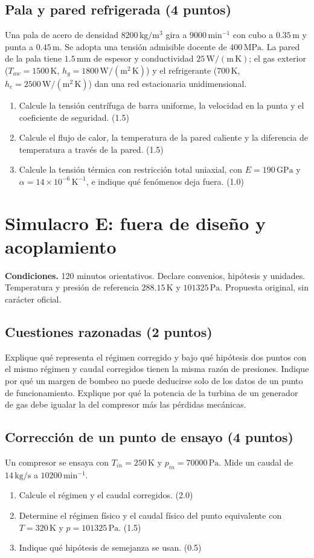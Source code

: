 \section{Pala y pared refrigerada (4 puntos)}
Una pala de acero de densidad $8200\,\mathrm{kg/m^3}$ gira a $9000\,\mathrm{min^{-1}}$ con cubo a $0.35\,\mathrm m$ y punta a $0.45\,\mathrm m$. Se adopta una tensión admisible docente de $400\,\mathrm{MPa}$. La pared de la pala tiene $1.5\,\mathrm{mm}$ de espesor y conductividad $25\,\mathrm{W/(m\,K)}$; el gas exterior ($T_{aw}=1500\,\mathrm K$, $h_g=1800\,\mathrm{W/(m^2\,K)}$) y el refrigerante ($700\,\mathrm K$, $h_c=2500\,\mathrm{W/(m^2\,K)}$) dan una red estacionaria unidimensional.
\begin{enumerate}[label=\alph*)]
\item Calcule la tensión centrífuga de barra uniforme, la velocidad en la punta y el coeficiente de seguridad. (1.5)
\item Calcule el flujo de calor, la temperatura de la pared caliente y la diferencia de temperatura a través de la pared. (1.5)
\item Calcule la tensión térmica con restricción total uniaxial, con $E=190\,\mathrm{GPa}$ y $\alpha=14\times10^{-6}\,\mathrm{K^{-1}}$, e indique qué fenómenos deja fuera. (1.0)
\end{enumerate}

\chapter{Simulacro E: fuera de diseño y acoplamiento}
\noindent\textbf{Condiciones.} 120 minutos orientativos. Declare convenios, hipótesis y unidades. Temperatura y presión de referencia $288.15\,\mathrm K$ y $101325\,\mathrm{Pa}$. Propuesta original, sin carácter oficial.
\section{Cuestiones razonadas (2 puntos)}
Explique qué representa el régimen corregido y bajo qué hipótesis dos puntos con el mismo régimen y caudal corregidos tienen la misma razón de presiones. Indique por qué un margen de bombeo no puede deducirse solo de los datos de un punto de funcionamiento. Explique por qué la potencia de la turbina de un generador de gas debe igualar la del compresor más las pérdidas mecánicas.
\section{Corrección de un punto de ensayo (4 puntos)}
Un compresor se ensaya con $T_{in}=250\,\mathrm K$ y $p_{in}=70000\,\mathrm{Pa}$. Mide un caudal de $14\,\mathrm{kg/s}$ a $10200\,\mathrm{min^{-1}}$.
\begin{enumerate}[label=\alph*)]
\item Calcule el régimen y el caudal corregidos. (2.0)
\item Determine el régimen físico y el caudal físico del punto equivalente con $T=320\,\mathrm K$ y $p=101325\,\mathrm{Pa}$. (1.5)
\item Indique qué hipótesis de semejanza se usan. (0.5)
\end{enumerate}
